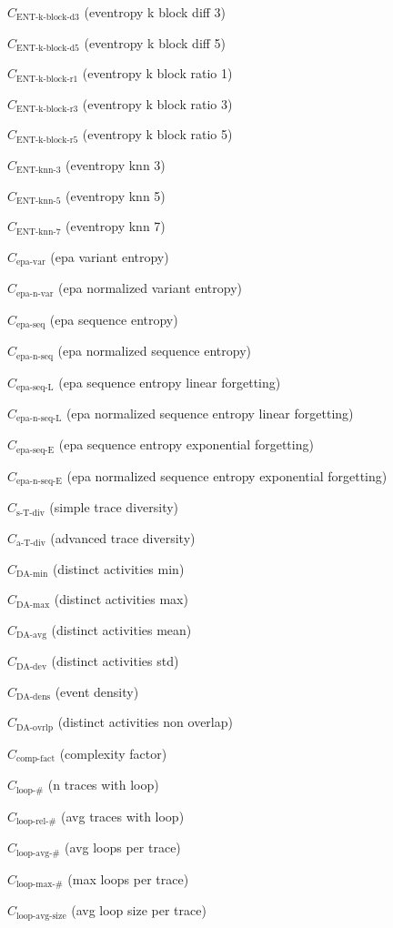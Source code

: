 \documentclass[a4paper]{article}
\newcommand{\daminname}{\text{DA-min}}
\newcommand{\damin}{C_{\daminname}}
\newcommand{\daavgname}{\text{DA-avg}}
\newcommand{\daavg}{C_{\daavgname}}
\newcommand{\damaxname}{\text{DA-max}}
\newcommand{\damax}{C_{\damaxname}}
\newcommand{\dadevname}{\text{DA-dev}}
\newcommand{\dadev}{C_{\dadevname}}
\newcommand{\dadensname}{\text{DA-dens}}
\newcommand{\dadens}{C_{\dadensname}}
\newcommand{\daoverlapname}{\text{DA-ovrlp}}
\newcommand{\daoverlap}{C_{\daoverlapname}}
\newcommand{\complexityfactorname}{\text{comp-fact}}
\newcommand{\complexityfactor}{C_{\complexityfactorname}}
\newcommand{\simpletracedivname}{\text{s-T-div}}
\newcommand{\simpletracediv}{C_{\simpletracedivname}}
\newcommand{\advtracedivname}{\text{a-T-div}}
\newcommand{\advtracediv}{C_{\advtracedivname}}
\newcommand{\loopnumname}{\text{loop-\#}}
\newcommand{\loopnum}{C_{\loopnumname}}
\newcommand{\looprelnumname}{\text{loop-rel-\#}}
\newcommand{\looprelnum}{C_{\looprelnumname}}
\newcommand{\loopavgname}{\text{loop-avg-\#}}
\newcommand{\loopavg}{C_{\loopavgname}}
\newcommand{\loopmaxname}{\text{loop-max-\#}}
\newcommand{\loopmax}{C_{\loopmaxname}}
\newcommand{\loopavgsizename}{\text{loop-avg-size}}
\newcommand{\loopavgsize}{C_{\loopavgsizename}}
\newcommand{\entkblockdthreename}{\text{ENT-k-block-d3}}
\newcommand{\entkblockdthree}{C_{\entkblockdthreename}}
\newcommand{\entkblockdfivename}{\text{ENT-k-block-d5}}
\newcommand{\entkblockdfive}{C_{\entkblockdfivename}}
\newcommand{\entkblockronename}{\text{ENT-k-block-r1}}
\newcommand{\entkblockrone}{C_{\entkblockronename}}
\newcommand{\entkblockrthreename}{\text{ENT-k-block-r3}}
\newcommand{\entkblockrthree}{C_{\entkblockrthreename}}
\newcommand{\entkblockrfivename}{\text{ENT-k-block-r5}}
\newcommand{\entkblockrfive}{C_{\entkblockrfivename}}
\newcommand{\entknnthreename}{\text{ENT-knn-3}}
\newcommand{\entknnthree}{C_{\entknnthreename}}
\newcommand{\entknnfivename}{\text{ENT-knn-5}}
\newcommand{\entknnfive}{C_{\entknnfivename}}
\newcommand{\entknnsevenname}{\text{ENT-knn-7}}
\newcommand{\entknnseven}{C_{\entknnsevenname}}
\newcommand{\epavariantname}{\text{epa-var}}
\newcommand{\epavariant}{C_{\epavariantname}}
\newcommand{\epanormvariantname}{\text{epa-n-var}}
\newcommand{\epanormvariant}{C_{\epanormvariantname}}
\newcommand{\epasequencename}{\text{epa-seq}}
\newcommand{\epasequence}{C_{\epasequencename}}
\newcommand{\epanormsequencename}{\text{epa-n-seq}}
\newcommand{\epanormsequence}{C_{\epanormsequencename}}
\newcommand{\epasequencelname}{\text{epa-seq-L}}
\newcommand{\epasequencel}{C_{\epasequencelname}}
\newcommand{\epanormsequencelname}{\text{epa-n-seq-L}}
\newcommand{\epanormsequencel}{C_{\epanormsequencelname}}
\newcommand{\epasequenceename}{\text{epa-seq-E}}
\newcommand{\epasequencee}{C_{\epasequenceename}}
\newcommand{\epanormsequenceename}{\text{epa-n-seq-E}}
\newcommand{\epanormsequencee}{C_{\epanormsequenceename}}
\begin{document}
\begin{compactenum}
\item $\entkblockdthree$ (eventropy k block diff 3)
\item $\entkblockdfive$ (eventropy k block diff 5)
\item $\entkblockrone$ (eventropy k block ratio 1)
\item $\entkblockrthree$ (eventropy k block ratio 3)
\item $\entkblockrfive$ (eventropy k block ratio 5)
\item $\entknnthree$ (eventropy knn 3)
\item $\entknnfive$ (eventropy knn 5)
\item $\entknnseven$ (eventropy knn 7)
\item $\epavariant$ (epa variant entropy)
\item $\epanormvariant$ (epa normalized variant entropy)
\item $\epasequence$ (epa sequence entropy)
\item $\epanormsequence$ (epa normalized sequence entropy)
\item $\epasequencel$ (epa sequence entropy linear forgetting)
\item $\epanormsequencel$ (epa normalized sequence entropy linear forgetting)
\item $\epasequencee$ (epa sequence entropy exponential forgetting)
\item $\epanormsequencee$ (epa normalized sequence entropy exponential forgetting)
\item $\simpletracediv$ (simple trace diversity)
\item $\advtracediv$ (advanced trace diversity)
\item $\damin$ (distinct activities min)
\item $\damax$ (distinct activities max)
\item $\daavg$ (distinct activities mean)
\item $\dadev$ (distinct activities std)
\item $\dadens$ (event density)
\item $\daoverlap$ (distinct activities non overlap)
\item $\complexityfactor$ (complexity factor)
\item $\loopnum$ (n traces with loop)
\item $\looprelnum$ (avg traces with loop)
\item $\loopavg$ (avg loops per trace)
\item $\loopmax$ (max loops per trace)
\item $\loopavgsize$ (avg loop size per trace)

\end{compactenum}
\end{document}
